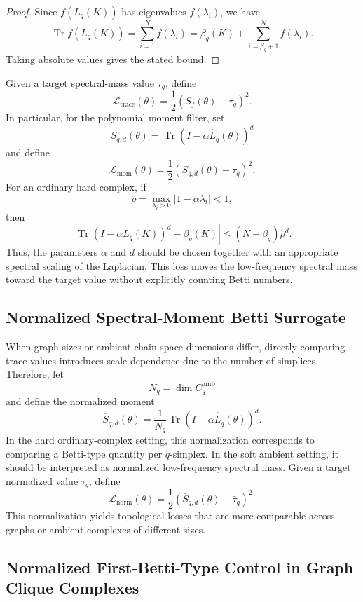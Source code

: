 \documentclass[pdflatex,sn-mathphys-ay]{sn-jnl}%
\theoremstyle{thmstyleone}%
\theoremstyle{thmstyletwo}%
\theoremstyle{thmstylethree}%
\begin{document}
\begin{proof}
Since \(f(L_q(K))\) has eigenvalues \(f(\lambda_i)\), we have
\[
\operatorname{Tr}f(L_q(K))
=
\sum_{i=1}^{N}f(\lambda_i)
=
\beta_q(K)
+
\sum_{i=\beta_q+1}^{N}f(\lambda_i).
\]
Taking absolute values gives the stated bound.
\end{proof}


Given a target spectral-mass value \(\tau_q\), define
\[
\mathcal{L}_{\mathrm{trace}}(\theta)
=
\frac{1}{2}
\left(
S_f(\theta)-\tau_q
\right)^2.
\]
In particular, for the polynomial moment filter, set
\[
S_{q,d}(\theta)
=
\operatorname{Tr}
\left(
I-\alpha\widehat{L}_q(\theta)
\right)^d
\]
and define
\[
\mathcal{L}_{\mathrm{mom}}(\theta)
=
\frac{1}{2}
\left(
S_{q,d}(\theta)-\tau_q
\right)^2.
\]
For an ordinary hard complex, if
\[
\rho
=
\max_{\lambda_i>0}|1-\alpha\lambda_i|<1,
\]
then
\[
\left|
\operatorname{Tr}(I-\alpha L_q(K))^d-\beta_q(K)
\right|
\le
(N-\beta_q)\rho^d.
\]
Thus, the parameters \(\alpha\) and \(d\) should be chosen together with an appropriate spectral scaling of the Laplacian.
This loss moves the low-frequency spectral mass toward the target value without explicitly counting Betti numbers.

\subsection{Normalized Spectral-Moment Betti Surrogate}

When graph sizes or ambient chain-space dimensions differ, directly comparing trace values introduces scale dependence due to the number of simplices.
Therefore, let
\[
N_q=\dim C_q^{\mathrm{amb}}
\]
and define the normalized moment
\[
\overline{S}_{q,d}(\theta)
=
\frac{1}{N_q}
\operatorname{Tr}
\left(
I-\alpha\widehat{L}_q(\theta)
\right)^d.
\]
In the hard ordinary-complex setting, this normalization corresponds to comparing a Betti-type quantity per \(q\)-simplex. In the soft ambient setting, it should be interpreted as normalized low-frequency spectral mass.
Given a target normalized value \(\bar{\tau}_q\), define
\[
\mathcal{L}_{\mathrm{norm}}(\theta)
=
\frac{1}{2}
\left(
\overline{S}_{q,d}(\theta)-\bar{\tau}_q
\right)^2.
\]
This normalization yields topological losses that are more comparable across graphs or ambient complexes of different sizes.

\subsection{Normalized First-Betti-Type Control in Graph Clique Complexes}
\end{document}
